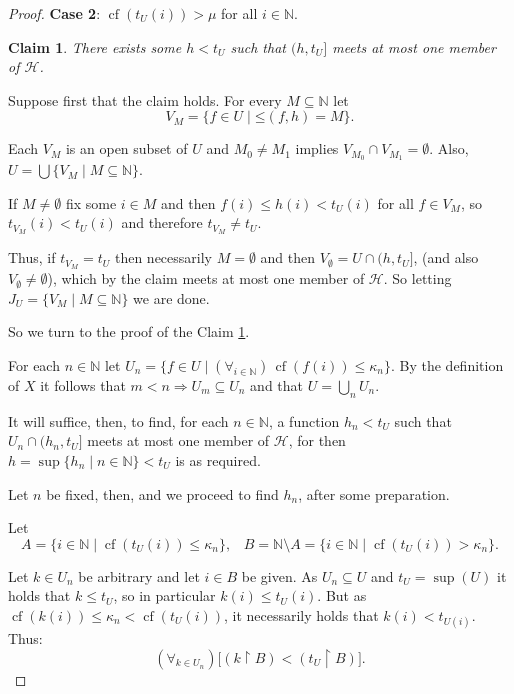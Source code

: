 \documentclass{amsart}
\newtheorem{claim}{Claim}[theorem]
\theoremstyle{remark}
\DeclareMathOperator{\cf}{cf}
\renewcommand\mid{\mathrel{|}\allowbreak}
\begin{document}
\begin{proof}
\medskip

          \noindent
          \textbf{Case 2}: \(\cf(t_{U}(i))>\mu \) for all \(i\in \mathbb N\).

   \begin{claim}\label{aux}
There exists some \(h<t_{U}\) such that \((h,t_{U}]\) meets at most one member of \(\mathcal H\).
     \end{claim}

     Suppose first that  the claim holds. For every \(M\subseteq \mathbb N\) let
            \[V_{M}=\{f\in U\mid \mathord{\le}
       (f,h)=M\}.\]

     Each \(V_{M}\) is an open subset of \(U\) and \(M_{0}\not=M_{1}\) implies
     \(V_{M_{0}}\cap V_{M_{1}}=\emptyset\). Also,
     \(U=\bigcup \{V_M\mid M\subseteq \mathbb N\}\).

If \(M\not=\emptyset\) fix some \(i\in M\) and then
\(f(i)\le h(i)<t_U(i)\) for all \(f\in V_{M}\), so \(t_{V_M}(i)<t_{U}(i)\) and therefore \(t_{V_{M}}\not=t_{U}\).

     Thus, if \(t_{{V_{M}}}=t_{U}\) then necessarily \(M=\emptyset\) and then
     \(V_{\emptyset}=U\cap  (h,t_{U}]\), (and  also \(V_{\emptyset}\not=\emptyset\)),
     which by the claim meets at most one member of
     \(\mathcal H\).
     So letting
     \(J_{U}=\{V_{M}\mid M\subseteq \mathbb N\}\) we are done.

     So we turn to the proof of the Claim \ref{aux}.


     For each \(n\in \mathbb N\) let
     \(U_{n}=\{f\in U\mid (\forall_{i\in \mathbb N})\,\cf(f(i))\le \kappa_{n}\}\). By the definition of
     \(X\) it follows that \(m<n\Rightarrow U_m\subseteq U_n\) and that 
     \(U=\bigcup_{n}U_{n}\).

     It will suffice, then,  to find, for each \(n\in \mathbb N\), a function \(h_{n}<t_{U}\) such that \(U_{n}\cap (h_{n},t_{U}]\) meets at most one member of \(\mathcal H\), for then \(h=\sup\{h_{n}\mid n\in \mathbb N\}<t_{U}\) is as required.

     Let \(n\) be fixed, then, and we proceed to find \(h_{n}\), after     some preparation.

     Let
     \[A=\{i\in \mathbb N\mid\cf(t_{U}(i))\le \kappa_{n}\},\;\;\;
       B=\mathbb N\setminus A=\{i\in \mathbb N\mid \cf(t_{U}(i))>\kappa_{n}\}.\]

  Let \(k\in U_{n}\) be arbitrary and let \(i\in B\) be given.
As \(U_{n}\subseteq U\) and \(t_{U}=\sup(U)\) it holds that
\(k\le t_{U}\), so in particular \(k(i)\le t_{U}(i)\). But as
\(\cf(k(i))\le\kappa_{n}<\cf(t_{U}(i))\),
it necessarily holds that   \(k(i)<t_{U(i)}\).
Thus:
\begin{equation}\label{lessless}
  (\forall_{k\in U_{n}})\big[(k\restriction B)<(t_{U}\restriction B)\big].\tag{\(*\)}
  \end{equation}


\end{proof}
\end{document}
